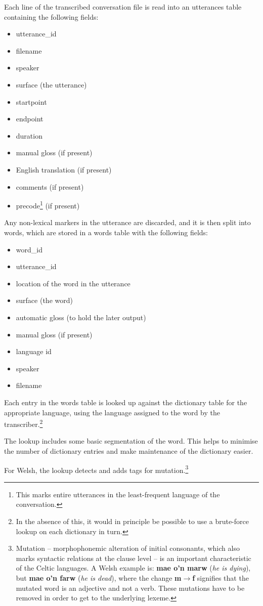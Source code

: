 \documentclass[11pt]{article}
\begin{document}
Each line of the transcribed conversation file is read into an utterances table containing the following fields:
\begin{itemize}
\setlength{\itemsep}{-2mm}
\item utterance\_id
\item filename
\item speaker
\item surface (the utterance)
\item startpoint
\item endpoint
\item duration
\item manual gloss (if present)
\item English translation (if present)
\item comments (if present)
\item precode\footnote{This marks entire utterances in the least-frequent language of the conversation.} (if present)
\end{itemize}

Any non-lexical markers in the utterance are discarded, and it is then split into words, which are stored in a words table with the following fields:
\begin{itemize}
\setlength{\itemsep}{-2mm}
\item word\_id
\item utterance\_id
\item location of the word in the utterance
\item surface (the word)
\item automatic gloss (to hold the later output)
\item manual gloss (if present)
\item language id
\item speaker
\item filename
\end{itemize}

Each entry in the words table is looked up against the dictionary table for the appropriate language, using the language assigned to the word by the transcriber.\footnote{In the absence of this, it would in principle be possible to use a brute-force lookup on each dictionary in turn.}

The lookup includes some basic segmentation of the word.  This helps to minimise the number of dictionary entries and make maintenance of the dictionary easier.

For Welsh, the lookup detects and adds tags for mutation.\footnote{Mutation -- morphophonemic alteration of initial consonants, which also marks syntactic relations at the clause level -- is an important characteristic of the Celtic languages. A Welsh example is: \textbf{mae o'n marw} (\textit{he is dying}), but \textbf{mae o'n farw} (\textit{he is dead}), where the change \textbf{m$\rightarrow$f} signifies that the mutated word is an adjective and not a verb. These mutations have to be removed in order to get to the underlying lexeme.}
\end{document}
